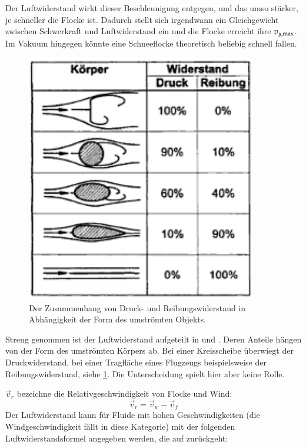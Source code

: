 Der Luftwiderstand wirkt dieser Beschleunigung entgegen, und das umso
stärker, je schneller die Flocke ist. Dadurch stellt sich irgendwann
ein Gleichgewicht zwischen Schwerkraft und Luftwiderstand ein und die
Flocke erreicht ihre 
$v_{y,\textnormal{max}}$. Im Vakuum hingegen könnte eine
Schneeflocke theoretisch beliebig schnell fallen.
\begin{figure}[ht]
    \centering
    \includegraphics[width=10cm]{images/drag_forces}
    \caption{Der Zusammenhang von Druck- und Reibungswiderstand in Abhängigkeit der Form des umströmten Objekts.}
\label{fig:implementation_snowflake_drag_forces}
\end{figure}

Streng genommen ist der Luftwiderstand aufgeteilt in
 und
. Deren Anteile hängen von der Form
des umströmten Körpers ab. Bei einer Kreisscheibe überwiegt der
Druckwiderstand, bei einer Tragfläche eines Flugzeugs beispielsweise
der Reibungswiderstand, siehe
\cref{fig:implementation_snowflake_drag_forces}. Die Unterscheidung
spielt hier aber keine Rolle.

$\vec{v}_r$ bezeichne die Relativgeschwindigkeit von Flocke und Wind:
\begin{equation}
\vec{v}_r = \vec{v}_w - \vec{v}_f
\end{equation}
Der Luftwiderstand kann für Fluide mit hohen Geschwindigkeiten (die
Windgeschwindigkeit fällt in diese Kategorie) mit der folgenden
Luftwiderstandsformel angegeben werden, die auf 
zurückgeht:

